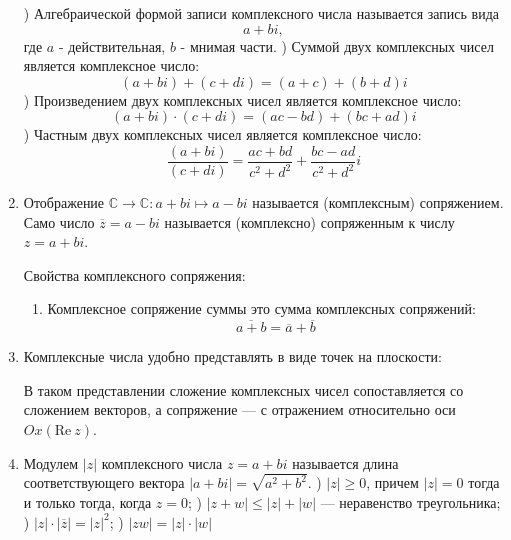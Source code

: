 \documentclass[a4paper,12pt]{article}
\renewcommand{\Re}{\mathrm{Re\:}}
\begin{document}
\begin{enumerate}
		) Алгебраической формой записи комплексного числа называется запись вида
		\[
		a + bi,
		\]
		где $a$ - действительная, $b$ - мнимая части.
		) Суммой двух комплексных чисел является комплексное число:
		\[
		(a + bi) + (c + di) = (a + c) + (b + d)i
		\]
		) Произведением двух комплексных чисел является комплексное число:
		\[
			(a + bi) \cdot (c + di) = (ac - bd) + (bc + ad)i
		\]
		) Частным двух комплексных чисел является комплексное число:
		\[
		\frac{(a + bi)}{(c + di)} = \frac{ac + bd}{c^2 + d^2} + \frac{bc - ad}{c^2 + d^2}i
		\]
		
		\item Отображение $\mathbb{C} \rightarrow \mathbb{C} : a + bi \mapsto a - bi$ называется (комплексным) сопряжением. Само число $\overline{z} = a - bi$ называется (комплексно) сопряженным к числу $z = a + bi$. 
		
		Свойства комплексного сопряжения:
		\begin{enumerate}
			\item Комплексное сопряжение суммы это сумма комплексных сопряжений:
			\[
			\overline{a + b} = \overline{a} + \overline{b}
			\]
		\end{enumerate}
		
		\item Комплексные числа удобно представлять в виде точек на плоскости:
		\begin{center}
		
		\end{center}
		В таком представлении сложение комплексных чисел сопоставляется со сложением векторов, а сопряжение — с отражением относительно оси $Ox (\Re z)$.
		
		\item Модулем $|z|$ комплексного числа $z = a + bi$ называется длина соответствующего вектора $|a+bi| = \sqrt{a^2 + b^2}$.
		) $|z| \geqslant 0$, причем $|z| = 0$ тогда и только тогда, когда $z = 0$;
		) $|z + w| \leqslant |z| + |w|$ — неравенство треугольника;
		) $|z|\cdot|\overline{z}| = |z|^2$;
		) $|zw| = |z| \cdot |w|$
		

\end{enumerate}
\end{document}
